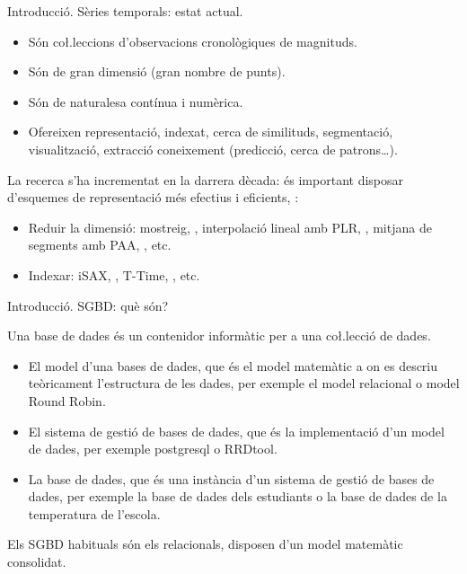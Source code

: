 \begin{frame}{Introducció. Sèries temporals: estat actual.}

\begin{itemize}
\item Són co\l.leccions d'observacions cronològiques de magnituds.
\item Són de gran dimensió (gran nombre de punts).
\item Són de naturalesa contínua i numèrica.
\item Ofereixen representació, indexat, cerca de similituds,
  segmentació, visualització, extracció coneixement (predicció, cerca
  de patrons\ldots).
\end{itemize}

La recerca s'ha incrementat en la darrera dècada: és important
disposar d'esquemes de representació més efectius i eficients,
\parencite{fu11}:
\begin{itemize}
\item Reduir la dimensió: mostreig, \parencite{astrom69}, interpolació
  lineal amb PLR, \parencite{keogh97}, mitjana de segments amb PAA,
  \parencite{keogh00}, etc.
\item Indexar: iSAX, \parencite{keogh08:isax}, T-Time,
  \parencite{assfalg08:ttime}, etc.
\end{itemize}


\end{frame}


\begin{frame}{Introducció. SGBD: què són?}


Una base de dades és un contenidor informàtic per a una co\l.lecció de dades.

\begin{itemize}
\item El model d'una bases de dades, que és el model matemàtic a on es
  descriu teòricament l'estructura de les dades, per exemple el model
  relacional o model Round Robin.

\item El sistema de gestió de bases de dades, que és la implementació
  d'un model de dades, per exemple postgresql o
  RRDtool. 

\item La base de dades, que és una instància d'un sistema de gestió de
  bases de dades, per exemple la base de dades dels estudiants o la
  base de dades de la temperatura de l'escola.
\end{itemize}


Els SGBD habituals són els relacionals,  disposen d'un model matemàtic consolidat.

\end{frame}



